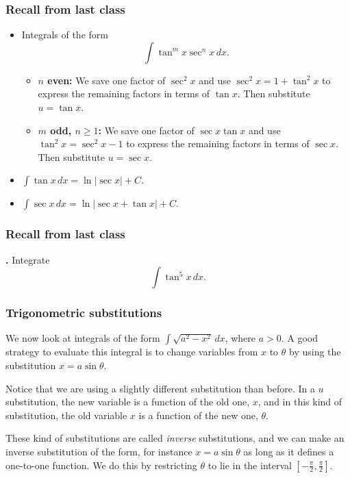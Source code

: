 \documentclass[t]{beamer}
\theoremstyle{plain}
\theoremstyle{definition}
\newcommand{\ds}{\displaystyle}
\newcommand{\dx}{\,dx}
\newcounter{heading}
\newcommand{\newhead}[1]{\medskip\stepcounter{heading}\noindent\textbf{\hspace{0.2cm}{#1}.}}
\begin{document}
\begin{frame}
\frametitle{Recall from last class}
\begin{itemize}[<+->]
\item Integrals of the form \[ \ds\int \tan^mx \sec^nx\,dx.\]
\begin{itemize}[<+->]
\item \textbf{$n$ even:} We save one factor of $\sec^2x$ and use $\sec^2x=1+\tan^2x$ to express the remaining factors in terms of $\tan x$. Then substitute $u=\tan x$.
\item \textbf{$m$ odd, $n\geq 1$:} We save one factor of $\sec x\tan x$ and use $\tan^2x=\sec^2x-1$ to express the remaining factors in terms of $\sec x$. Then substitute $u=\sec x$.
\end{itemize}
\item $\int\tan x\,dx=\ln|\sec x|+C.$
\item $\int\sec x\,dx=\ln|\sec x+\tan x|+C.$
\end{itemize}
\end{frame}

\begin{frame}
\frametitle{Recall from last class}
\newhead{Example}
Integrate \[\int\tan^5x\dx.\]
\end{frame}

\begin{frame}
\frametitle{Trigonometric substitutions}


\noindent We now look at integrals of the form $\int \sqrt{a^{2} - x^{2}}\,dx$, where $a>0$.  A good strategy to evaluate this integral is to change variables from $x$ to $\theta$ by using the substitution $x = a\sin\theta$.\pause

\vspace*{.4cm}

\noindent Notice that we are using a slightly different substitution than before.  In a $u$ substitution, the new variable is a function of the old one, $x$, and in this kind of substitution, the old variable $x$ is a function of the new one, $\theta$.\pause

\medskip

\noindent These kind of substitutions are called \emph{inverse} substitutions, and we can make an inverse substitution of the form, for instance $x = a\sin \theta$ as long as it defines a one-to-one function.  We do this by restricting $\theta$ to lie in the interval $[-\frac{\pi}{2},\frac{\pi}{2}]$.
\end{frame}
\end{document}
